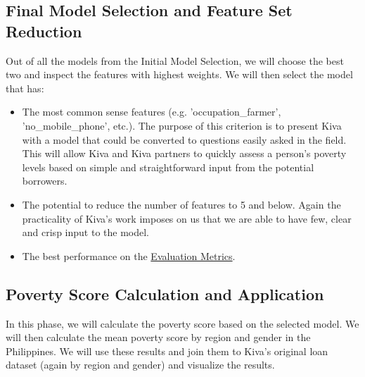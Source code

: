 \documentclass{article}
\begin{document}
\subsection{Final Model Selection and Feature Set Reduction}
Out of all the models from the Initial Model Selection, we will choose the best two and inspect the features with highest weights. We will then select the model that has:
\begin{itemize}
  \item The most common sense features (e.g. 'occupation\_farmer', 'no\_mobile\_phone', etc.). The purpose of this criterion is to present Kiva with a model that could be converted to questions easily asked in the field. This will allow Kiva and Kiva partners to quickly assess a person’s poverty levels based on simple and straightforward input from the potential borrowers.
  \item The potential to reduce the number of features to 5 and below. Again the practicality of Kiva's work imposes on us that we are able to have few, clear and crisp input to the model.
  \item The best performance on the \hyperlink{metrics}{Evaluation Metrics}.
\end{itemize}

\subsection{Poverty Score Calculation and Application}
In this phase, we will calculate the poverty score based on the selected model. We will then calculate the mean poverty score by region and gender in the Philippines. We will use these results and join them to Kiva's original loan dataset (again by region and gender) and visualize the results.
\end{document}
